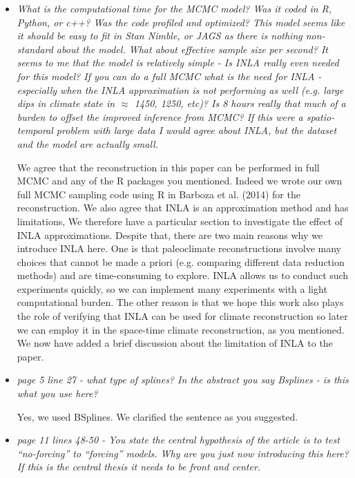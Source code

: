 \documentclass[11pt]{article}
\begin{document}
\begin{itemize}
\item \textit{What is the computational time for the MCMC model? Was it coded in
    R, Python, or c++? Was the code profiled and optimized? This model seems
    like it should be easy to fit in Stan Nimble, or JAGS as there is nothing non-standard about the model. What about effective sample size per second? It seems
to me that the model is relatively simple - Is INLA really even needed for this
model? If you can do a full MCMC what is the need for INLA - especially when the
INLA approximation is not performing as well (e.g. large dips in climate state
in $\approx$ 1450, 1250, etc)? Is 8 hours really that much of a burden to offset
the improved
inference from MCMC? If this were a spatio-temporal problem with large data I
would agree about INLA, but the dataset and the model are actually small.
}

We agree that the reconstruction in this paper can be performed in full MCMC and any of the R packages you mentioned. Indeed we wrote our own full MCMC sampling code using R in Barboza et al. (2014) for the reconstruction. We also agree that INLA is an approximation method and has limitations, We therefore have a particular section to investigate the effect of INLA approximations. Despite that,  there are two main reasons why we introduce INLA here. One is that paleoclimate reconstructions involve many choices that cannot be made a priori (e.g. comparing different data reduction methods) and are time-consuming to explore. INLA allows us to conduct such experiments quickly, so we can implement many experiments with a light computational burden. The other reason is that we hope this work also plays the role of verifying that INLA can be used for climate reconstruction so later we can employ it in the space-time climate reconstruction, as you mentioned. We now have added a brief discussion about the limitation of INLA to the paper.


\item \textit{page 5 line 27 - what type of splines? In the abstract you say Bsplines - is this what you use here?}

Yes, we used BSplines. We clarified the sentence as you suggested.

\item \textit{page 11 lines 48-50 - You state the central hypothesis of the
    article is to test “no-forcing” to “forcing” models. Why are you just now
    introducing this here? If this is the central thesis it needs to be front
    and center.}


\end{itemize}
\end{document}
